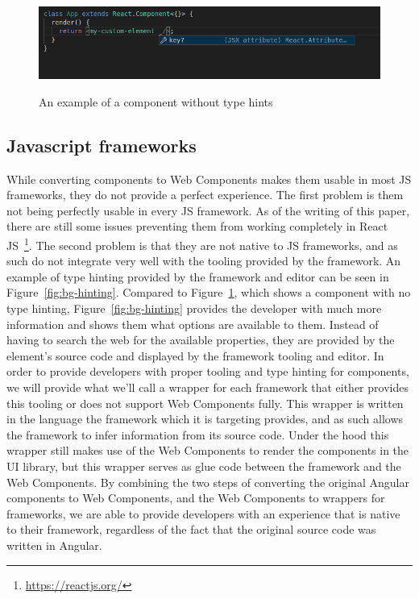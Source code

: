 \begin{figure}[h]
	\caption{An example of a component without type hints}
	\includegraphics[width=\columnwidth]{figures/background/no-hinting.png}
	\label{fig:bg-no-hinting}
	\centering
\end{figure}

\subsection{Javascript frameworks}\label{sec:bg-jsframeworks}
While converting components to Web Components makes them usable in most JS frameworks, they do not provide a perfect experience. The first problem is them not being perfectly usable in every JS framework. As of the writing of this paper, there are still some issues preventing them from working completely in React JS~\footnote{\url{https://reactjs.org/}}. The second problem is that they are not native to JS frameworks, and as such do not integrate very well with the tooling provided by the framework. An example of type hinting provided by the framework and editor can be seen in Figure~\ref{fig:bg-hinting}. Compared to Figure~\ref{fig:bg-no-hinting}, which shows a component with no type hinting, Figure~\ref{fig:bg-hinting} provides the developer with much more information and shows them what options are available to them. Instead of having to search the web for the available properties, they are provided by the element's source code and displayed by the framework tooling and editor. In order to provide developers with proper tooling and type hinting for components, we will provide what we'll call a wrapper for each framework that either provides this tooling or does not support Web Components fully. This wrapper is written in the language the framework which it is targeting provides, and as such allows the framework to infer information from its source code. Under the hood this wrapper still makes use of the Web Components to render the components in the UI library, but this wrapper serves as glue code between the framework and the Web Components. By combining the two steps of converting the original Angular components to Web Components, and the Web Components to wrappers for frameworks, we are able to provide developers with an experience that is native to their framework, regardless of the fact that the original source code was written in Angular.